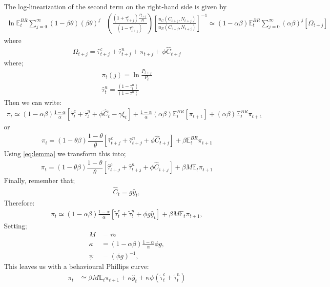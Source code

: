 \documentclass[11pt]{article}
\newcommand{\bb}{\bigbreak\noindent}
\begin{document}
\begin{spacing}{2}
The log-linearization of the second term on the right-hand side is given by
\begin{align*}
	\ln \mathbb{E}_t^{BR} \sum_{j=0}^{\infty} (1-\beta \theta)(\beta \theta)^j
	&\left(\frac{\left(1 + \tau^c_{t+j}\right) \frac{P_{t+j}}{P_t}}{\left(1 - \tau^n_{t+j}\right)}\right) 
	\left[\frac{u_C\left(C_{t+j}, N_{t+j}\right)}{u_N\left(C_{t+j}, N_{t+j}\right)} \right]^{-1} 
	\simeq (1 - \alpha \beta) \mathbb{E}_t^{BR} \sum_{j=0}^{\infty} (\alpha \beta)^j [\Omega_{t+j}]
\end{align*}
where
\begin{align*}
	\Omega_{t+j} = \hat{\tau}^c_{t+j} + \hat{\tau}^n_{t+j} + \pi_{t+j} + \phi \hat{C}_{t+j} 
\end{align*}
where; 
\begin{align*}
	\pi_t(j) = \ln \frac{P_{t+j}}{P_t} \\
	\hat{\tau}^n_t = \frac{\left(1 - \tau^n_t\right)}{\left(1 - \tau^n\right)}
\end{align*}
Then we can write:
\begin{align*}
	\pi_t \simeq (1 - \alpha \beta) \frac{1 - \alpha}{\alpha} 
	\left[\tilde{\tau}_t^c + \tilde{\tau}_t^n + \phi \hat{C}_t - \gamma \hat{\xi}_t \right] 
	+ \frac{1 - \alpha}{\alpha} (\alpha \beta) \mathbb{E}_t^{BR} [\pi_{t+1}] 
	+ (\alpha \beta) \mathbb{E}_t^{BR} \pi_{t+1}
\end{align*}
or
\begin{align*}
	\pi_t = (1-\theta \beta) \dfrac{1-\theta}{\theta} \left[\hat{\tau}^c_{t+j} + \hat{\tau}^n_{t+j} +  \phi \hat{C}_{t+j}\right] + \beta \mathbb{E}_t^{BR} \pi_{t+1}
\end{align*}
Using \ref{eq:lemma} we transform this into; 
\begin{align*}
	\pi_t = (1-\theta \beta) \dfrac{1-\theta}{\theta} \left[\hat{\tau}^c_{t+j} + \hat{\tau}^n_{t+j} +  \phi \hat{C}_{t+j}\right] + \beta M \mathbb{E}_t \pi_{t+1}
\end{align*}
\bb
Finally, remember that;
\begin{align*}
	\hat{C}_t = g \hat{y}_t, 
\end{align*}
Therefore: 
\begin{align*}
	\pi_t \simeq (1 - \alpha \beta) \frac{1 - \alpha}{\alpha} 
	\left[\tilde{\tau}_t^c + \tilde{\tau}_t^n + \phi g \hat{y}_t \right] 
	+ \beta M \mathbb{E}_t \pi_{t+1},
\end{align*}
Setting; 
\begin{align*}
	M &= \bar{m}\\
	\kappa &= (1 - \alpha \beta) \frac{1 - \alpha}{\alpha} \phi g, \\
	\psi &= (\phi g)^{-1},
\end{align*}
This leaves us with a behavioural Phillips curve: 
\begin{align*}
	\pi_t &\simeq \beta M \mathbb{E}_t \pi_{t+1}  + \kappa \hat{y}_t  +\kappa \psi (\tilde{\tau}_t^c + \tilde{\tau}_t^n)
\end{align*}



\end{spacing}
\end{document}
